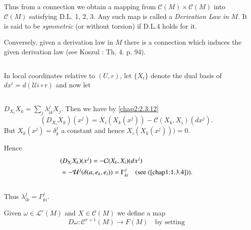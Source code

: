 \subsection{}\label{chap2:2.4.2}

Thus \pageoriginale from a connection we obtain a mapping from
$\mathscr{C}(M)\times \mathscr{C}(M)$ into $\mathscr{C}(M)$ satisfying
D.L. 1, 2, 3. Any such map is called a {\em Derivation Law in $M$.} It
is said to be {\em symmetric} (or without torsion) if D.L.4 holds for
it.

Conversely, given a derivation law in $M$ there is a connection which
induces the given derivation law (see Koszul \cite{18}: Th. 4. p. 94).

\subsection{}\label{chap2:2.4.3}

In local coordinates relative to $(U,r)$, let $\{X_{i}\}$ denote the
dual basis of $dx^{i}=d(\mathcal{U}i\circ r)$ and now let

\subsection{}\label{chap2:2.4.4}

$D_{X_{i}}X_{k}=\sum\limits_{j} \lambda^{j}_{ik}X_{j}$. Then we have
by \ref{chap2:2.3.12}
$$
(D_{X_{i}}X_{k})(x^{j})=X_{i}(X_{k}(x^{j}))-\mathcal{C}(X_{k},X_{i})(dx^{j}).
$$
But $X_{k}(x^{j})=\delta^{j}_{k}$ a constant and hence
$X_{i}(X_{k}(x^{j})))=0$.

Hence
\begin{align*}
& (D_{X_{i}}X_{k})(x^{j})=-\mathcal{C}(X_{k},X_{i})(dx^{j})\\
&
  =-\mathcal{U}^{j}(\delta(a,e_{k},e_{i}))=\Gamma^{j}_{ki}\quad\text{(see
    (\ref{chap1:1.3.4}))}. 
\end{align*}

\setcounter{subsection}{4}
\subsection{}\label{chap2:2.4.5}

Thus $\lambda^{j}_{ik}=\Gamma^{j}_{ki}$.

Given $\omega\in \mathscr{L}^{r}(M)$ and $X\in \mathscr{C}(M)$ we
define a map
$$
D\omega:\mathscr{C}^{r+1}(M)\to F(M)\quad\text{by setting}
$$

\subsection{}\label{chap2:2.4.6}

